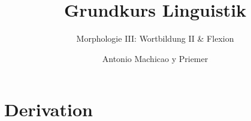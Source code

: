 
\title{Grundkurs Linguistik}

\subtitle{Morphologie III: Wortbildung II \& Flexion}

\author[aMyP]{
	{\small Antonio Machicao y Priemer}
}


\date{ }





\huberlintitlepage










\section{Derivation}




